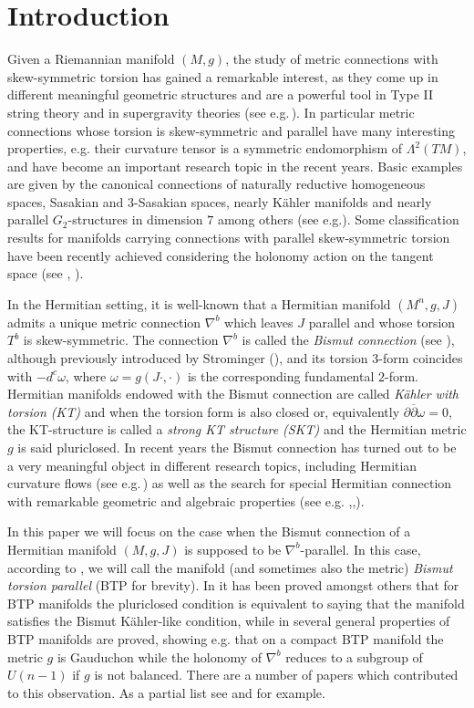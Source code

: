\documentclass{amsart}
\numberwithin{equation}{section}
\theoremstyle{definition}
\renewcommand{\1}{\mathds{1}}
\renewcommand{\>}{\rightarrow}
\begin{document}
\section{Introduction}
Given a Riemannian manifold $(M,g)$, the study of metric connections with skew-symmetric torsion has gained a remarkable interest, as they come up in different meaningful geometric structures and are a powerful tool in Type II string theory and in supergravity theories (see e.g.\,\cite{Ag}). In particular metric connections whose torsion is skew-symmetric and parallel have many interesting properties, e.g. their curvature tensor is a symmetric endomorphism of $\Lambda^2(TM)$, and have become an important research topic in the recent years. Basic examples are given by the canonical connections of naturally reductive homogeneous spaces, Sasakian and $3$-Sasakian spaces, nearly K\"ahler manifolds and nearly parallel $G_2$-structures in dimension $7$ among others (see e.g.). Some classification results for manifolds carrying connections with parallel skew-symmetric torsion have been recently achieved considering the holonomy action on the tangent space (see \cite{CS}, \cite{CMS}).

In the Hermitian setting, it is well-known that a Hermitian manifold $(M^n,g,J)$ admits a unique metric connection $\nabla^b$ which leaves $J$ parallel and whose torsion $T^b$ is skew-symmetric. The connection $\nabla^b$ is called the {\it Bismut connection} (see \cite{Bismut}), although previously introduced by Strominger (\cite{Strominger}), and its torsion $3$-form coincides with $-d^c\omega$, where $\omega=g(J\cdot,\cdot)$ is the corresponding fundamental $2$-form. Hermitian manifolds endowed with the Bismut connection are called {\it K\"ahler with torsion (KT)} and when the torsion form is also closed or, equivalently $\partial\overline\partial \omega=0$, the KT-structure is called a {\it strong KT structure (SKT)} and the Hermitian metric $g$ is said pluriclosed.  In recent years the Bismut connection has turned out to be a very meaningful object in different research topics, including Hermitian curvature flows (see e.g.\,\cite{ST}) as well as the search for special Hermitian connection with remarkable geometric and algebraic properties (see e.g. \cite{AV},\cite{AOUV},\cite{FT}).

In this paper we will focus on the case when the Bismut connection of a Hermitian manifold $(M,g,J)$ is supposed to be $\nabla^b$-parallel. In this case, according to \cite{ZhaoZ22}, we will call the manifold (and sometimes also the metric) {\it Bismut torsion parallel} ({\rm BTP} for brevity). In \cite{ZhaoZ19Str} it has been proved amongst others that for {\rm BTP} manifolds the pluriclosed condition is equivalent to saying that the manifold satisfies the Bismut K\"ahler-like condition, while in \cite{ZhaoZ22} several general properties of {\rm BTP} manifolds are proved, showing e.g. that on a compact {\rm BTP} manifold the metric $g$ is Gauduchon while the holonomy of $\nabla^b$ reduces to a subgroup of $U(n-1)$ if $g$ is not balanced. There are a number of papers which contributed to this observation. As a partial list see  \cite{AV} and \cite{ZhaoZ22} for example.
\end{document}
